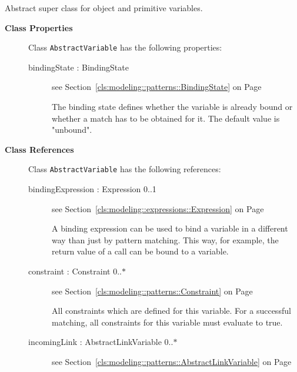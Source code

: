 	
			
Abstract super class for object and primitive variables.	
		
	


\begin{description}

	\item[\textbf{Class Properties}] Class \texttt{AbstractVariable} has the following properties:
	\begin{description}
\item[bindingState : BindingState 	]
see Section~\ref{cls:modeling::patterns::BindingState} on Page~\pageref{cls:modeling::patterns::BindingState}\hspace{\fill}
\nopagebreak


	
			
The binding state defines whether the variable is already bound or whether a match has to be obtained for it. The default value is "unbound".	
		
	
	\end{description}
	
	\item[\textbf{Class References}] Class \texttt{AbstractVariable} has the following references:
	\begin{description}
\item[bindingExpression : Expression 			0..1]
see Section~\ref{cls:modeling::expressions::Expression} on Page~\pageref{cls:modeling::expressions::Expression}\hspace{\fill}
\nopagebreak


	
			
A binding expression can be used to bind a variable in a different way than just by pattern matching. This way, for example, the return value of a call can be bound to a variable.	
		
	
\item[constraint : Constraint 			0..$*$]
see Section~\ref{cls:modeling::patterns::Constraint} on Page~\pageref{cls:modeling::patterns::Constraint}\hspace{\fill}
\nopagebreak


	
			
All constraints which are defined for this variable. For a successful matching, all constraints for this variable must evaluate to true.	
		
	
\item[incomingLink : AbstractLinkVariable 			0..$*$]
see Section~\ref{cls:modeling::patterns::AbstractLinkVariable} on Page~\pageref{cls:modeling::patterns::AbstractLinkVariable}\hspace{\fill}
\nopagebreak



\end{description}
\end{description}
